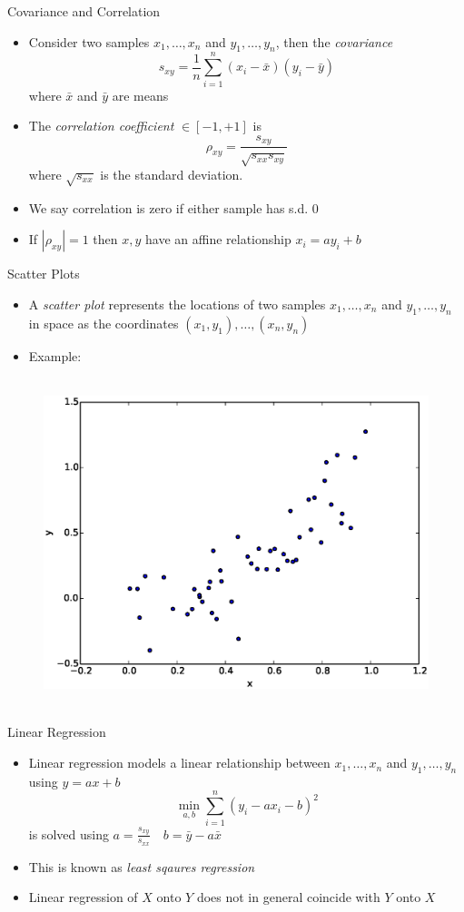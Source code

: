 \documentclass{beamer}
\begin{document}
\begin{frame}{Covariance and Correlation}
\begin{itemize} 
 \item Consider two samples $x_1, \ldots, x_n$ and $y_1, \ldots, y_n$, then the \emph{covariance}
 \begin{displaymath} 
  s_{xy} = \frac{1}{n} \sum_{i=1}^n (x_i - \bar{x})(y_i - \bar{y}) 
 \end{displaymath}
  where $\bar{x}$ and $\bar{y}$ are means 
 \item The \emph{correlation coefficient} $\in [-1, +1]$ is 
 \begin{displaymath}
  \rho_{xy} = \frac{s_{xy}}{\sqrt{s_{xx}s_{xy}}}
 \end{displaymath}
  where $\sqrt{s_{xx}}$ is the standard deviation. 
 \item We say correlation is zero if either sample has s.d. 0 
 \item If $|\rho_{xy}| = 1$ then $x, y$ have an affine relationship $x_i = a y_i + b$ 
\end{itemize}
\end{frame}

\begin{frame}{Scatter Plots} 
\begin{itemize}
 \item A \emph{scatter plot} represents the locations of two samples $x_1, \ldots, x_n$ and $y_1, \ldots, y_n$ in space as the coordinates $(x_1, y_1), \ldots, (x_n, y_n)$ 
 \item Example: 
\end{itemize}
  \begin{figure}[htp]
\mbox{
\includegraphics[width=0.5\linewidth]{ScatterPlot.eps}
}
\end{figure} 
\end{frame}

\begin{frame}{Linear Regression} 
\begin{itemize} 
 \item Linear regression models a linear relationship between $x_1, \ldots, x_n$ and $y_1, \ldots, y_n$ using $y = ax + b$ 
 \begin{displaymath} 
  \min_{a, b} \sum_{i=1}^n (y_i  - a x_i - b)^2 
 \end{displaymath}
 is solved using $a = \frac{s_{xy}}{s_{xx}} \quad b = \bar{y} - a\bar{x}$
 \item This is known as \emph{least sqaures regression}
\item Linear regression of $X$ onto $Y$ does not in general coincide with $Y$ onto $X$ 
 \end{itemize}
\end{frame}
\end{document}
